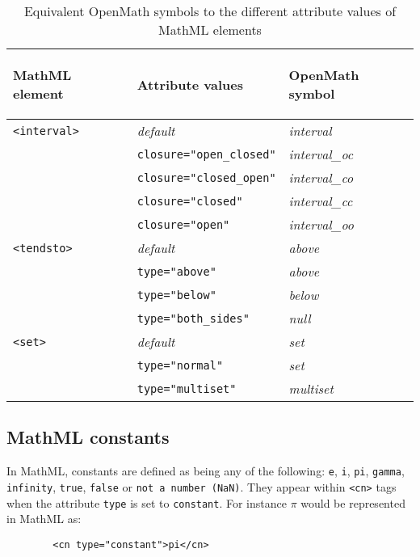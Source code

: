 \begin{table}[h]
\begin{center}

\begin{tabular}{|l|l|l|} \hline   
\label{allatts}

{\bf MathML element}  		&{\bf Attribute values}			& {\bf 
OpenMath symbol} \\ \hline
\verb|<interval>|		&{\it default}				& {\it interval} \\
				&\verb|closure="open_closed"|		& {\it interval\_oc}	\\	
				&\verb|closure="closed_open"|		& {\it interval\_co}	\\	
				&\verb|closure="closed"|		& {\it interval\_cc}	\\	
				&\verb|closure="open"|			& {\it interval\_oo}	\\ \hline
\verb|<tendsto>|		&{\it default}				& {\it above} 	\\
\verb||				&\verb|type="above"|			& {\it above}	\\
\verb||				&\verb|type="below"|			& {\it below}	\\
\verb||				&\verb|type="both_sides"|		& {\it null}	\\ \hline
\verb|<set>|			&{\it default}				& {\it set}	\\
				&\verb|type="normal"|			& {\it set}	\\
				&\verb|type="multiset"|			& {\it multiset}	\\
\hline

\end{tabular}

\end{center}     
\caption{Equivalent OpenMath symbols to the different attribute values of MathML 
elements }

\end{table}     

\subsection{MathML constants}

In MathML, constants are defined as being any of the following:  
\verb|e|, \verb|i|, \verb|pi|, \verb|gamma|, \verb|infinity|,
\verb|true|, \verb|false| or \verb|not a number (NaN)|. They appear
within \verb|<cn>| tags when the attribute \verb|type| is set to
\verb|constant|. For instance $\pi$ would be represented in MathML as:

\begin{verbatim}
        <cn type="constant">pi</cn>
\end{verbatim}

